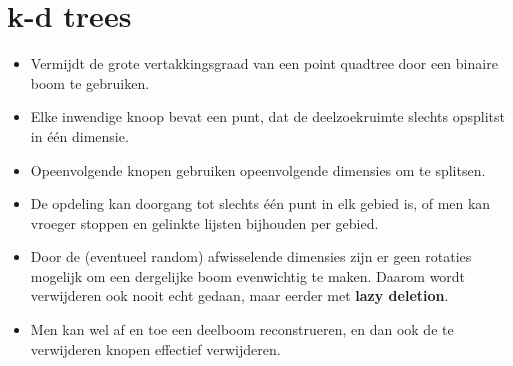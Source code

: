 \section{k-d trees}
\begin{itemize}
    \item Vermijdt de grote vertakkingsgraad van een point quadtree door een binaire boom te gebruiken.
    \item Elke inwendige knoop bevat een punt, dat de deelzoekruimte slechts opsplitst in één dimensie.
    \item Opeenvolgende knopen gebruiken opeenvolgende dimensies om te splitsen.
    \item De opdeling kan doorgang tot slechts één punt in elk gebied is, of men kan vroeger stoppen en gelinkte lijsten bijhouden per gebied.
    \item Door de (eventueel random) afwisselende dimensies zijn er geen rotaties mogelijk om een dergelijke boom evenwichtig te maken. Daarom wordt verwijderen ook nooit echt gedaan, maar eerder met \textbf{lazy deletion}.
    \item Men kan wel af en toe een deelboom reconstrueren, en dan ook de te verwijderen knopen effectief verwijderen.
\end{itemize}